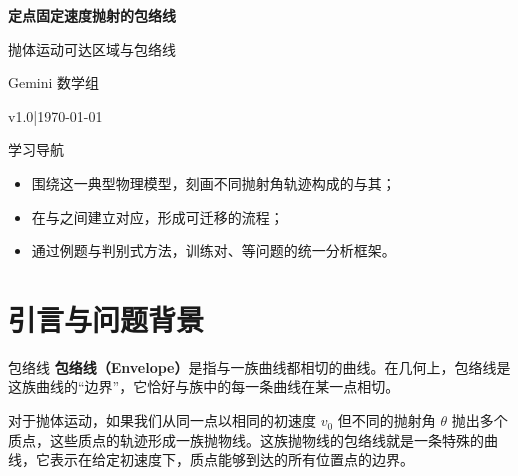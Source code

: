 \documentclass[a4paper,11pt]{ctexart}
\renewcommand{\notetitle}{定点固定速度抛射的包络线}
\renewcommand{\noteauthor}{Gemini 数学组}
\renewcommand{\notedate}{\today}
\renewcommand{\notesubtitle}{抛体运动可达区域与包络线}
\renewcommand{\noteversion}{v1.0}
\begin{document}
\thispagestyle{empty}
\setcounter{page}{1}

\noindent
\begin{minipage}[t][0.7\textheight][c]{\textwidth}
  \raggedleft
  \vspace*{\fill}
  {\sffamily\bfseries\Huge\color{accent}\notetitle\par}
  \vspace{0.6em}
  {\Large\color{inkgray}\notesubtitle\par}
  \vspace{0.5em}
  {\large\color{inkgray}\noteauthor\par}
  \vspace{0.4em}
  {\normalsize\color{inkgray}\noteversion\quad|\quad\notedate\par}
  \vspace*{\fill}
\end{minipage}

\begin{center}
\begin{minipage}{0.84\textwidth}
  \textcolor{inkgray}{\sffamily\small 学习导航}\\
  \begin{itemize}
    \item 围绕这一典型物理模型，刻画不同抛射角轨迹构成的与其；
    \item 在与之间建立对应，形成可迁移的流程；
    \item 通过例题与判别式方法，训练对、等问题的统一分析框架。
  \end{itemize}
\end{minipage}
\end{center}
\vspace{1em}

\clearpage
\thispagestyle{plain}

\tableofcontents
\newpage

\section{引言与问题背景}

\begin{definitionbox}{包络线}
\textbf{包络线（Envelope）}是指与一族曲线都相切的曲线。在几何上，包络线是这族曲线的“边界”，它恰好与族中的每一条曲线在某一点相切。

对于抛体运动，如果我们从同一点以相同的初速度 $v_0$ 但不同的抛射角 $\theta$ 抛出多个质点，这些质点的轨迹形成一族抛物线。这族抛物线的包络线就是一条特殊的曲线，它表示在给定初速度下，质点能够到达的所有位置点的边界。
\end{definitionbox}
\end{document}
